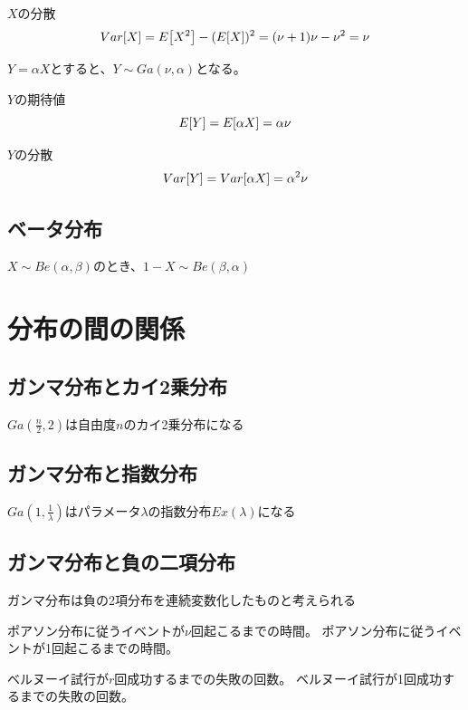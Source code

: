 \(X\)の分散
\begin{equation}
  Var \qty [X] = E \qty [X^2] - (E \qty [X])^2 = (\nu + 1)\nu - \nu^2 = \nu
\end{equation}


\(Y = \alpha X\)とすると、\(Y \sim Ga(\nu, \alpha)\)となる。

\(Y\)の期待値
\begin{equation}
  E \qty [Y] = E \qty [\alpha X] = \alpha \nu
\end{equation}

\(Y\)の分散
\begin{equation}
  Var \qty [Y] = Var \qty [\alpha X] = \alpha^2 \nu
\end{equation}





\subsection{ベータ分布}

\(X \sim Be(\alpha, \beta)\)のとき、\(1 - X \sim Be(\beta, \alpha)\)

\section{分布の間の関係}

\subsection{ガンマ分布とカイ2乗分布}

\(Ga(\frac{n}{2}, 2)\)は自由度\(n\)のカイ2乗分布になる

\subsection{ガンマ分布と指数分布}

\(Ga(1, \frac{1}{\lambda})\)はパラメータ\(\lambda\)の指数分布\(Ex(\lambda)\)になる

\subsection{ガンマ分布と負の二項分布}

ガンマ分布は負の2項分布を連続変数化したものと考えられる

\begin{outline}[description]
   ポアソン分布に従うイベントが\(\nu\)回起こるまでの時間。
   ポアソン分布に従うイベントが1回起こるまでの時間。
  
  \1 [負の2項分布 \(NB(r, p)\)] ベルヌーイ試行が\(r\)回成功するまでの失敗の回数。
   ベルヌーイ試行が1回成功するまでの失敗の回数。
\end{outline}

